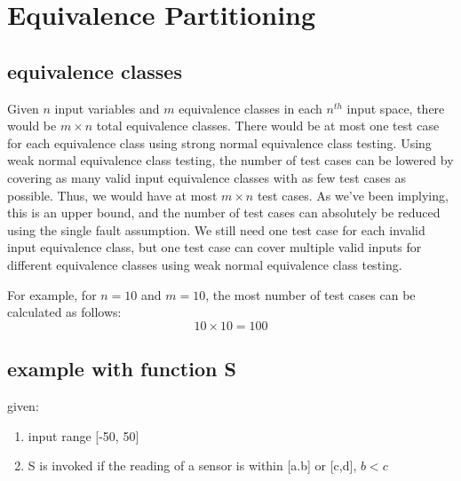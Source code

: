 \documentclass[letterpaper]{article}
\begin{document}
\section{Equivalence Partitioning}
\subsection{equivalence classes}
Given $n$ input variables and $m$ equivalence classes in each $n^{th}$
input space, there would be $m \times n$ total equivalence classes.
There would be at most one test case for each 
equivalence class using strong normal equivalence class testing.
Using weak normal equivalence class testing, the number of test
cases can be lowered by covering as many valid input equivalence classes
with as few test cases as possible.
Thus, we would have at most $m \times n $
test cases. As we've been implying, this is an upper bound, and the number of
test cases can absolutely be reduced using the single fault assumption. 
We still need one test case for each invalid input equivalence class, but one
test case can cover multiple valid inputs for different equivalence classes
using weak normal equivalence class testing.

For example, for $n=10$ and $m=10$, the most number of test cases can be
calculated as follows:
\[ 10 \times 10 = 100 \]

\subsection{example with function S}
given:
\begin{enumerate}
	\item input range [-50, 50]
	\item S is invoked if the reading of a sensor is within [a.b] or [c,d], $b < c$
\end{enumerate}
\end{document}
